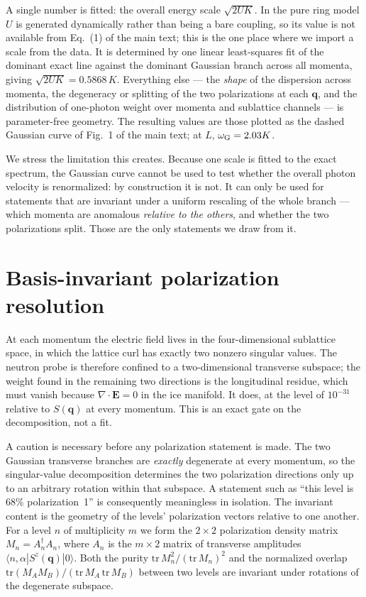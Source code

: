 \documentclass[aps,prl,twocolumn,amsmath,amssymb,superscriptaddress,
longbibliography,floatfix]{revtex4-2}
\newcommand{\bq}{\bm q}
\begin{document}
A single number is fitted: the overall energy scale $\sqrt{2UK}$. In
the pure ring model $U$ is generated dynamically rather than being a
bare coupling, so its value is not available from Eq.~(1) of the main text;
this is the one place where we import a scale from the data. It is
determined by one linear least-squares fit of the dominant exact line
against the dominant Gaussian branch across all momenta, giving
$\sqrt{2UK}=0.5868\,K$. Everything else --- the \emph{shape} of the
dispersion across momenta, the degeneracy or splitting of the two
polarizations at each $\bq$, and the distribution of one-photon weight
over momenta and sublattice channels --- is parameter-free geometry.
The resulting values are those plotted as the dashed Gaussian curve
of Fig.~1 of the main text; at $L$, $\omega_{\rm G}=2.03K$.

We stress the limitation this creates. Because one scale is fitted to
the exact spectrum, the Gaussian curve cannot be used to test whether
the overall photon velocity is renormalized: by construction it is
not. It can only be used for statements that are invariant under a
uniform rescaling of the whole branch --- which momenta are anomalous
\emph{relative to the others}, and whether the two polarizations split.
Those are the only statements we draw from it.


\section{Basis-invariant polarization resolution}
\label{sm:polar}


At each momentum the electric field lives in the four-dimensional
sublattice space, in which the lattice curl has exactly two nonzero
singular values. The neutron probe is therefore confined to a
two-dimensional transverse subspace; the weight found in the remaining
two directions is the longitudinal residue, which must vanish because
$\nabla\!\cdot\!\bm E=0$ in the ice manifold. It does, at the level of
$10^{-31}$ relative to $S(\bq)$ at every momentum. This is an exact
gate on the decomposition, not a fit.

A caution is necessary before any polarization statement is made. The
two Gaussian transverse branches are \emph{exactly} degenerate at every
momentum, so the singular-value decomposition determines the two
polarization directions only up to an arbitrary rotation within that
subspace. A statement such as ``this level is $68\%$ polarization~1''
is consequently meaningless in isolation. The invariant content is
the geometry of the levels' polarization vectors relative to one
another. For a level $n$ of multiplicity $m$ we form the $2\times2$
polarization density matrix $M_n=A_n^\dagger A_n$, where $A_n$ is the
$m\times2$ matrix of transverse amplitudes
$\langle n,\alpha|S^z(\bq)|0\rangle$. Both the purity
$\mathrm{tr}\,M_n^2/(\mathrm{tr}\,M_n)^2$ and the normalized overlap
$\mathrm{tr}(M_AM_B)/(\mathrm{tr}\,M_A\,\mathrm{tr}\,M_B)$ between two
levels are invariant under rotations of the degenerate subspace.
\end{document}
